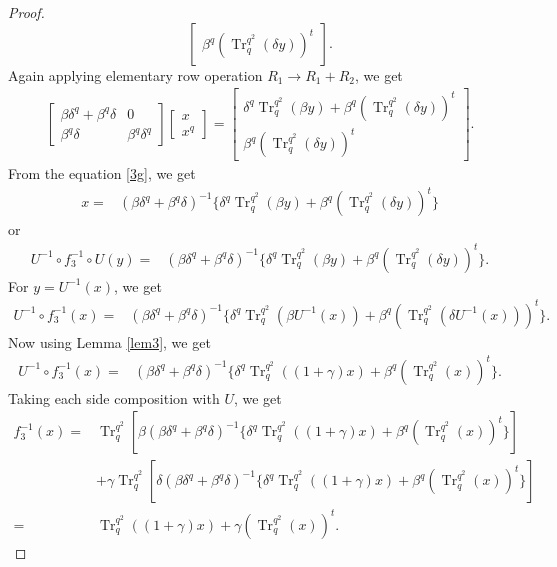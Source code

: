 \documentclass{birkjour}
\theoremstyle{definition}
\theoremstyle{remark}
\numberwithin{equation}{section}
\begin{document}
\begin{proof}
$$\begin{bmatrix}
		\beta^{q}(\operatorname{Tr}_{q}^{q^2}(\delta y))^t
	\end{bmatrix}.$$
	Again applying elementary row operation $R_1\rightarrow R_1+R_2$, we get
	\begin{align}\begin{bmatrix}
			\beta\delta^{q}+\beta^{q}\delta&0\\
			\beta^{q}\delta&\beta^{q}\delta^{q}
		\end{bmatrix}
		\begin{bmatrix}
			x\\x^{q}
		\end{bmatrix}=
	\begin{bmatrix}
		\delta^{q}\operatorname{Tr}_{q}^{q^2}(\beta y)+	\beta^{q}(\operatorname{Tr}_{q}^{q^2}(\delta y))^t\\
		\beta^{q}(\operatorname{Tr}_{q}^{q^2}(\delta y))^t
	\end{bmatrix}.\label{3g}\end{align}
	From the equation \ref{3g}, we get
	\begin{align*}
		x=&(\beta\delta^{q}+\beta^{q}\delta)^{-1}\{\delta^{q}\operatorname{Tr}_{q}^{q^2}(\beta y)+\beta^{q}(\operatorname{Tr}_{q}^{q^2}(\delta y))^t\}
	\end{align*}
	or\begin{align*}
		U^{-1}\circ f_3^{-1}\circ U(y)=&(\beta\delta^{q}+\beta^{q}\delta)^{-1}\{\delta^{q}\operatorname{Tr}_{q}^{q^2}(\beta y)+\beta^{q}(\operatorname{Tr}_{q}^{q^2}(\delta y))^t\}.
	\end{align*}
	For $y=U^{-1}(x)$, we get
	\begin{align*}
		U^{-1}\circ f_3^{-1}(x)=&(\beta\delta^{q}+\beta^{q}\delta)^{-1}\{\delta^{q}\operatorname{Tr}_{q}^{q^2}(\beta U^{-1}(x))+\beta^{q}(\operatorname{Tr}_{q}^{q^2}(\delta U^{-1}(x)))^t\}.
	\end{align*}
	Now using Lemma \ref{lem3}, we get
	\begin{align*}
		U^{-1}\circ f_3^{-1}(x)=&(\beta\delta^{q}+\beta^{q}\delta)^{-1}\{\delta^{q}\operatorname{Tr}_{q}^{q^2}((1+\gamma)x)+\beta^{q}(\operatorname{Tr}_{q}^{q^2}(x))^t\}.
	\end{align*}
	Taking each side composition with $U$, we get
	\begin{align*}
		f_3^{-1}(x)=&\operatorname{Tr}_{q}^{q^2}[\beta (\beta\delta^{q}+\beta^{q}\delta)^{-1}\{\delta^{q}\operatorname{Tr}_{q}^{q^2}((1+\gamma)x)+\beta^{q}(\operatorname{Tr}_{q}^{q^2}(x))^t\}]\\&+\gamma\operatorname{Tr}_{q}^{q^2}[\delta (\beta\delta^{q}+\beta^{q}\delta)^{-1}\{\delta^{q}\operatorname{Tr}_{q}^{q^2}((1+\gamma)x)+\beta^{q}(\operatorname{Tr}_{q}^{q^2}(x))^t\}]\\
		=&\operatorname{Tr}_{q}^{q^2}((1+\gamma)x)+\gamma(\operatorname{Tr}_{q}^{q^2}(x))^t.
	\end{align*}
\end{proof}
\end{document}
